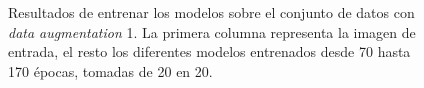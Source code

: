 \begin{figure}[H]
\centering
    \caption{Resultados de entrenar los modelos sobre el conjunto de datos con \textit{data augmentation} 1. La primera columna representa la imagen de entrada, el resto los diferentes modelos entrenados desde 70 hasta 170 épocas, tomadas de 20 en 20.} 
\end{figure}

